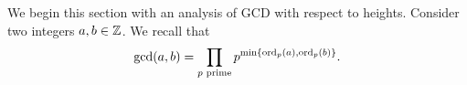 \documentclass[12pt]{article}
\begin{document}
    We begin this section with an analysis of GCD with respect to heights.
    Consider two integers $a, b \in \mathbb{Z}$.
    We recall that
    \[
        \gcd(a, b) = \prod_{p \text{ prime}} p^{\min\{{\rm ord}_p(a), {\rm ord}_p(b)\}}.
    \]
    
\end{document}
